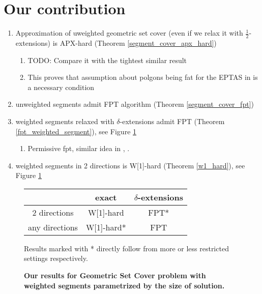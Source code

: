 \section{Our contribution}
\begin{enumerate}
\item Approximation of uweighted geometric set cover (even if we relax it with 
$\frac{1}{2}$-extensions) is APX-hard (Theorem \ref{segment_cover_apx_hard})
	\begin{enumerate}
	\item TODO: Compare it with the tightest similar result
	\item This proves that assumption about polgons being fat for
	the EPTAS in \cite{harpeled12} is a necessary condition
	\end{enumerate}
\item unweighted segments admit FPT algorithm (Theorem \ref{segment_cover_fpt})
\item weighted segments relaxed with $\delta$-extensions admit FPT (Theorem \ref{fpt_weighted_segment}),
    see Figure \ref{tab:weighted_fpt}
	\begin{enumerate}
	\item Permissive fpt, similar idea in \cite{permissive_problem1}, \cite{permissive_problem2}.
	\end{enumerate}
\item weighted segments in 2 directions is W[1]-hard (Theorem \ref{w1_hard}),
    see Figure \ref{tab:weighted_fpt}

\end{enumerate}


\begin{figure}[h]
\begin{center}
\begin{tabular}{ | c | c | c | }
\hline
                & exact     & $\delta$-extensions \\ 
\hline                
 2 directions   & W[1]-hard & FPT* \\  
\hline                
 any directions & W[1]-hard* & FPT \\
\hline                
\end{tabular}
\caption{\textbf{Our results for Geometric Set Cover problem with weighted segments 
parametrized by the size of solution.}}

Results marked with * directly follow from more or less restricted settings
respectively.
\label{tab:weighted_fpt}
\end{center}
\end{figure}


